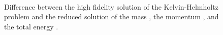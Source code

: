 \begin{figure} [t]
	\begin{centering}
	 \\
	\caption{Difference between the high fidelity solution of the Kelvin-Helmholtz problem and the reduced solution of the mass \protect{}, the momentum \protect{}, and the total energy \protect{}.}
	\label{p4.fig:conservation_DEIM}
	\end{centering}
\end{figure}

